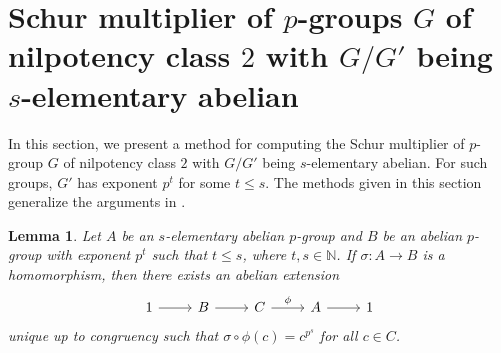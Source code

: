 \documentclass[preprint,sort&compress,12pt]{elsarticle}
\newtheorem{lemma}[theorem]{Lemma}
\numberwithin{equation}{section}
\theoremstyle{definition}
\begin{document}
\section{Schur multiplier of $p$-groups $G$ of nilpotency class $2$ with $G/G'$ being $s$-elementary abelian} 
\label{section: Schur multiplier of group with s elementary abelian}
In this section, we present a method for computing the Schur multiplier of
\(p\)-group $G$ of nilpotency class \(2\) with \(G/G'\) being
\(s\)-elementary abelian.
For such groups, \(G'\) has exponent \(p^{t}\) for some
\(t \leq s\).
The methods given in this section generalize the arguments in
\cite[Section~3.3]{Karp1987}.
\begin{lemma} \label{homomorphism to extension}
    Let $A$ be an $s$-elementary abelian $p$-group and $B$ be an abelian $p$-group with exponent $p^t$ such that $t \leq s$, where $t,s \in \mathbb{N}$. If $\sigma:A \to B$ is a homomorphism, then there exists an abelian extension
    \[
\begin{tikzcd}
  1 \arrow[r] & B \arrow[r] & C \arrow[r, "\phi"] & A \ar[r] & 1
\end{tikzcd}
\]
unique up to congruency such that $\sigma \circ \phi(c)=c^{p^s}$ for all $c \in C$.
\end{lemma}
\end{document}
